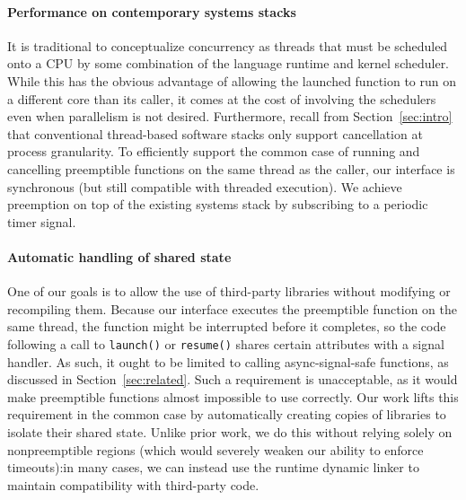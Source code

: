 \paragraph{Performance on contemporary systems stacks}
It is traditional to conceptualize concurrency as threads that must be scheduled onto
a CPU by some combination of the language runtime and kernel scheduler.  While this
has the obvious advantage of allowing the launched function to run on a different
core than its caller, it comes at the cost of involving the schedulers even when
parallelism is not desired.  Furthermore, recall from Section~\ref{sec:intro} that
conventional thread-based software stacks only support cancellation at process
granularity.  To efficiently support the common case of running and cancelling
preemptible functions on the same thread as the caller, our interface is synchronous
(but still compatible with threaded execution).  We achieve preemption on top of the
existing systems stack by subscribing to a periodic timer signal.

\paragraph{Automatic handling of shared state}
One of our goals is to allow the use of third-party libraries
without modifying or recompiling them.
Because our interface executes the preemptible function on the same thread, the
function might be interrupted before it completes, so the code following a call to
\texttt{launch()} or \texttt{resume()} shares certain attributes with a signal
handler.  As
such, it ought to be limited to calling async-signal-safe functions, as
discussed in Section~\ref{sec:related}.  Such a requirement is unacceptable, as
it would make preemptible functions almost impossible to use correctly.  Our work
lifts this requirement in the common case by automatically creating copies of
libraries to isolate their shared state.
Unlike prior work, we do this without relying solely on nonpreemptible regions
(which would severely weaken our ability to enforce timeouts):\@ in many cases, we
can instead use the runtime dynamic linker to maintain compatibility
with third-party code.

